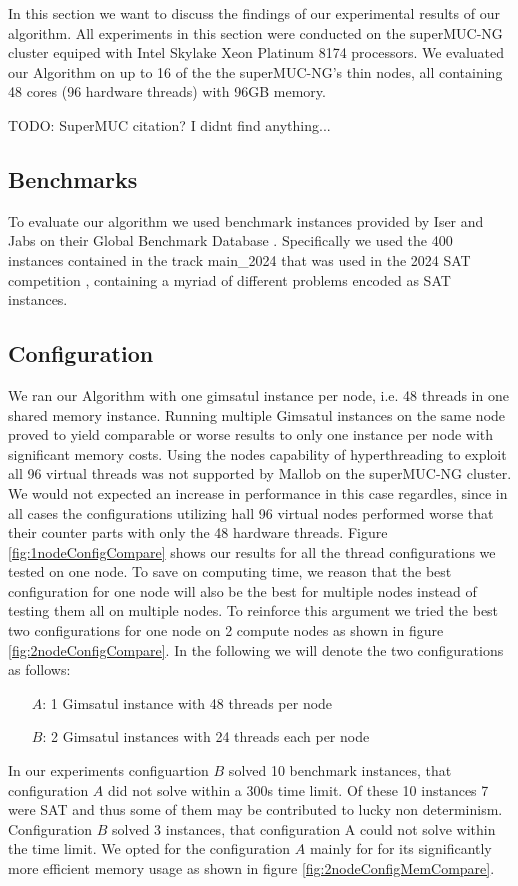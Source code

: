 \documentclass[12pt,a4paper,twoside]{scrartcl}
\numberwithin{equation}{section}
\begin{document}
In this section we want to discuss the findings of our experimental results of our algorithm. All experiments in this section were conducted on the superMUC-NG cluster equiped with Intel Skylake Xeon Platinum 8174 processors. We evaluated our Algorithm on up to 16 of the the superMUC-NG's thin nodes, all containing 48 cores (96 hardware threads) with 96GB memory.

TODO: SuperMUC citation? I didnt find anything...

\subsection{Benchmarks}
To evaluate our algorithm we used benchmark instances provided by Iser and Jabs on their Global Benchmark Database \cite{benchmarkDB}. Specifically we used the 400 instances contained in the track main\_2024 that was used in the 2024 SAT competition \cite{satComp2024}, containing a myriad of different problems encoded as SAT instances.

\subsection{Configuration}
We ran our Algorithm with one gimsatul instance per node, i.e. 48 threads in one shared memory instance. Running multiple Gimsatul instances on the same node proved to yield comparable or worse results to only one instance per node with significant memory costs. Using the nodes capability of hyperthreading to exploit all 96 virtual threads was not supported by Mallob on the superMUC-NG cluster. We would not expected an increase in performance in this case regardles, since in all cases the configurations utilizing hall 96 virtual nodes performed worse that their counter parts with only the 48 hardware threads. Figure \ref{fig:1nodeConfigCompare} shows our results for all the thread configurations we tested on one node. To save on computing time, we reason that the best configuration for one node will also be the best for multiple nodes instead of testing them all on multiple nodes. To reinforce this argument we tried the best two configurations for one node on 2 compute nodes as shown in figure \ref{fig:2nodeConfigCompare}. In the following we will denote the two configurations as follows:
\begin{itemize}
  \item[$A$:] 1 Gimsatul instance with 48 threads per node
  \item[$B$:] 2 Gimsatul instances with 24 threads each per node
\end{itemize}
In our experiments configuartion $B$ solved 10 benchmark instances, that configuration $A$ did not solve within a 300s time limit. Of these 10 instances 7 were SAT and thus some of them may be contributed to lucky non determinism. Configuration $B$ solved 3 instances, that configuration A could not solve within the time limit. We opted for the configuration $A$ mainly for for its significantly more efficient memory usage as shown in figure \ref{fig:2nodeConfigMemCompare}.
\end{document}
